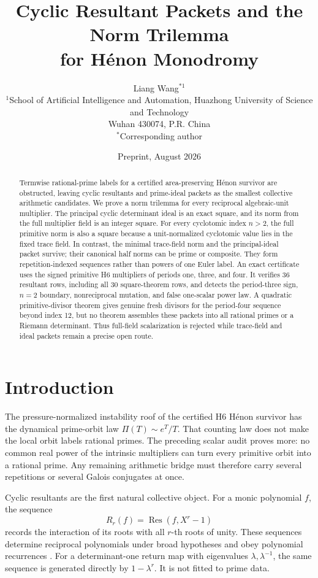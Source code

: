 \documentclass[11pt]{article}
\title{Cyclic Resultant Packets and the Norm Trilemma\\for H\'enon Monodromy}
\author{Liang Wang$^{*1}$\\
\small $^{1}$School of Artificial Intelligence and Automation, Huazhong University of Science and Technology\\
\small Wuhan 430074, P.R. China\\
\small $^*$Corresponding author}
\date{Preprint, August 2026}
\theoremstyle{definition}\newtheorem{definition}[theorem]{Definition}
\theoremstyle{remark}\newtheorem{remark}[theorem]{Remark}
\DeclareMathOperator{\Resultant}{Res}
\begin{document}
\maketitle

\begin{abstract}
Termwise rational-prime labels for a certified area-preserving H\'enon
survivor are obstructed, leaving cyclic resultants and prime-ideal packets as
the smallest collective arithmetic candidates.  We prove a norm trilemma for
every reciprocal algebraic-unit multiplier.  The principal cyclic
determinant ideal is an exact square, and its norm from the full multiplier
field is an integer square.  For every cyclotomic index $n>2$, the full
primitive norm is also a square because a unit-normalized cyclotomic value
lies in the fixed trace field.  In contrast, the minimal trace-field norm and
the principal-ideal packet survive; their canonical half norms can be prime
or composite.  They form repetition-indexed sequences rather than powers of
one Euler label.  An exact certificate uses the signed primitive H6
multipliers of periods one, three, and four.  It verifies 36 resultant rows,
including all 30 square-theorem rows, and detects the period-three sign,
$n=2$ boundary, nonreciprocal mutation, and false one-scalar power law.  A
quadratic primitive-divisor theorem gives genuine fresh divisors for the
period-four sequence beyond index 12, but no theorem assembles these packets
into all rational primes or a Riemann determinant.  Thus full-field
scalarization is rejected while trace-field and ideal packets remain a
precise open route.
\end{abstract}

\section{Introduction}

The pressure-normalized instability roof of the certified H6 H\'enon
survivor has the dynamical prime-orbit law $\Pi(T)\sim e^T/T$.  That counting
law does not make the local orbit labels rational primes.  The preceding
scalar audit proves more: no common real power of the intrinsic multipliers
can turn every primitive orbit into a rational prime.  Any remaining
arithmetic bridge must therefore carry several repetitions or several
Galois conjugates at once.

Cyclic resultants are the first natural collective object.  For a monic
polynomial $f$, the sequence
\[
R_r(f)=\Resultant(f,X^r-1)
\]
records the interaction of its roots with all $r$-th roots of unity.  These
sequences determine reciprocal polynomials under broad hypotheses and obey
polynomial recurrences \cite{hillar2005cyclic,hillar2004recurrences}.  For a
determinant-one return map with eigenvalues $\lambda,\lambda^{-1}$, the same
sequence is generated directly by $1-\lambda^r$.  It is not fitted to prime
data.
\end{document}
